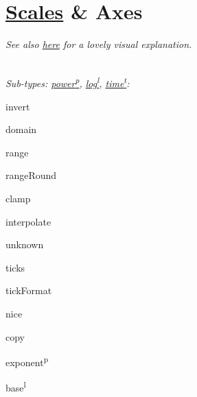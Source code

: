 \section{\href{https://github.com/d3/d3-scale}{Scales} \& Axes}

\begin{wrapfigure}[3]{l}{4.0cm}
\vspace{-5mm}
\href{https://medium.com/@mbostock/introducing-d3-scale-61980c51545f}{\resizebox{!}{2cm}{}}
\end{wrapfigure}

\textit{See also \href{http://www.jeromecukier.net/2011/08/11/d3-scales-and-color/}{here} for a lovely visual explanation.}\\



\ \\


\textit{Sub-types: \href{https://observablehq.com/@d3/continuous-scales\#scale\_pow}{power\textsuperscript{p}}, \href{https://observablehq.com/@d3/continuous-scales\#scale\_log}{log\textsuperscript{l}}, \href{https://observablehq.com/@d3/d3-scaletime}{time\textsuperscript{t}}:}
\begin{tinylist}{3}
    \item invert
    \item domain
    \item range
    \item rangeRound
    \item clamp
    \item interpolate
    \item unknown
    \item ticks
    \item tickFormat
    \item nice
    \item copy
    \item exponent\textsuperscript{p}
    \item base\textsuperscript{l}
\end{tinylist}



